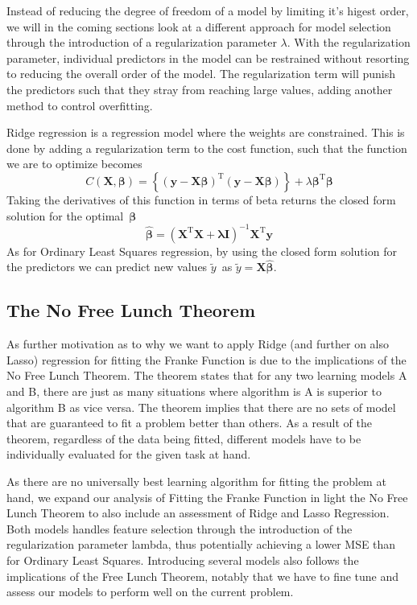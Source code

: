 \documentclass[11pt, a4paper]{article}
\begin{document}
Instead of reducing the degree of freedom of a model by limiting it's higest order, we will in the coming sections look at a different approach for model selection through the introduction of a regularization parameter $\lambda$. With the regularization parameter, individual predictors in the model can be restrained without resorting to reducing the overall order of the model. The regularization term will punish the predictors such that they stray from reaching large values, adding another method to control overfitting. \cite{Bishop2016}

Ridge regression is a regression model where the weights are constrained. \cite{Geron2019} This is done by adding a regularization term to the cost function, such that the function we are to optimize becomes
\[
  C\left(\bm{X},\bm{\beta}\right) = \left\{\left(\bm{y}-\bm{X}\bm{\beta}\right)^\text{T}\left(\bm{y}-\bm{X}\bm{\beta}\right)\right\}+\lambda\bm{\beta}^\text{T}\bm{\beta}
\]
Taking the derivatives of this function in terms of beta returns the closed form solution for the optimal $\bm{\beta}$
\[
  \bm{\hat{\beta}} = \left(\bm{X}^\text{T}\bm{X} + \bm{\lambda}\bm{I}\right)^{-1}\bm{X}^\text{T}\bm{y}
\]
As for Ordinary Least Squares regression, by using the closed form solution for the predictors we can predict new values $\tilde{y}$ as $\tilde{y} = \bm{X}\bm{\hat{\beta}}$.

\subsection*{The No Free Lunch Theorem}
As further motivation as to why we want to apply Ridge (and further on also Lasso) regression for fitting the Franke Function is due to the implications of the No Free Lunch Theorem. The theorem states that for any two learning models A and B, there are just as many situations where algorithm is A is superior to algorithm B as vice versa. \cite{Wolpert1996} The theorem implies that there are no sets of model that are guaranteed to fit a problem better than others. As a result of the theorem, regardless of the data being fitted, different models have to be individually evaluated for the given task at hand.

As there are no universally best learning algorithm for fitting the problem at hand, we expand our analysis of Fitting the Franke Function in light the No Free Lunch Theorem to also include an assessment of Ridge and Lasso Regression. Both models handles feature selection through the introduction of the regularization parameter lambda, thus potentially achieving a lower MSE than for Ordinary Least Squares. Introducing several models also follows the implications of the Free Lunch Theorem, notably that we have to fine tune and assess our models to perform well on the current problem. \cite{Goodfellow2016}
\end{document}
